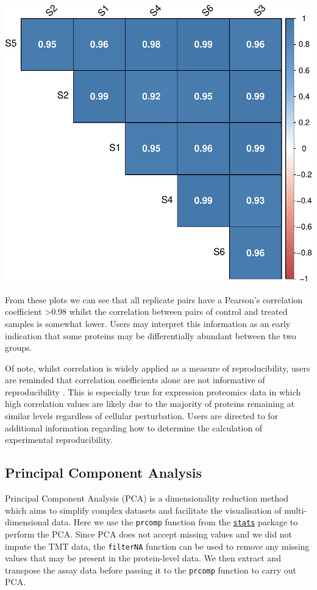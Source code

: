 \documentclass[9pt,a4paper,]{extarticle}
\begin{document}
\begin{center}\includegraphics[height=0.3\textheight]{workflow_expressions_files/figure-latex/correlation_plot_3-1} \end{center}

From these plots we can see that all replicate pairs have a Pearson's correlation
coefficient \textgreater0.98 whilst the correlation between pairs of control and treated
samples is somewhat lower. Users may interpret this information as an early
indication that some proteins may be differentially abundant between the two
groups.

Of note, whilst correlation is widely applied as a measure of reproducibility,
users are reminded that correlation coefficients alone are not informative of
reproducibility \citep{simply_stats, Bunting2019}. This is especially true for
expression proteomics data in which high correlation values are likely due to
the majority of proteins remaining at similar levels regardless of cellular
perturbation. Users are directed to \citep{Darbani2014} for additional information
regarding how to determine the calculation of experimental reproducibility.

\subsection{Principal Component Analysis}\label{principal-component-analysis}

Principal Component Analysis (PCA) is a dimensionality reduction method which
aims to simplify complex datasets and facilitate the visualisation of
multi-dimensional data. Here we use the \texttt{prcomp} function from the
\href{https://stat.ethz.ch/R-manual/R-devel/library/stats/html/00Index.html}{\texttt{stats}}
package to perform the PCA. Since PCA does not accept missing values and we did
not impute the TMT data, the \texttt{filterNA} function can be used to remove any
missing values that may be present in the protein-level data. We then extract
and transpose the assay data before passing it to the \texttt{prcomp} function to carry
out PCA.
\end{document}
